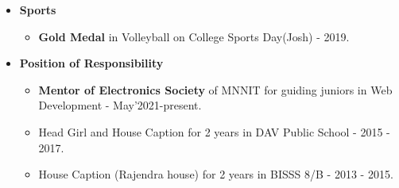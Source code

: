 \documentclass[10pt]{extarticle}
\begin{document}
\begin{itemize}
\item \textbf{Sports}
  \begin{itemize}
    \item \textbf{Gold Medal} in Volleyball on College Sports Day(Josh) - 2019.
  \end{itemize}
\item \textbf{Position of Responsibility}
  \begin{itemize}
    \item \textbf{Mentor of Electronics Society} of MNNIT for guiding juniors in Web Development - May’2021-present.
    \item Head Girl and House Caption for 2 years in DAV Public School - 2015 - 2017.
    \item House Caption (Rajendra house) for 2 years in BISSS 8/B - 2013 - 2015.
  \end{itemize}
\end{itemize}
\end{document}
